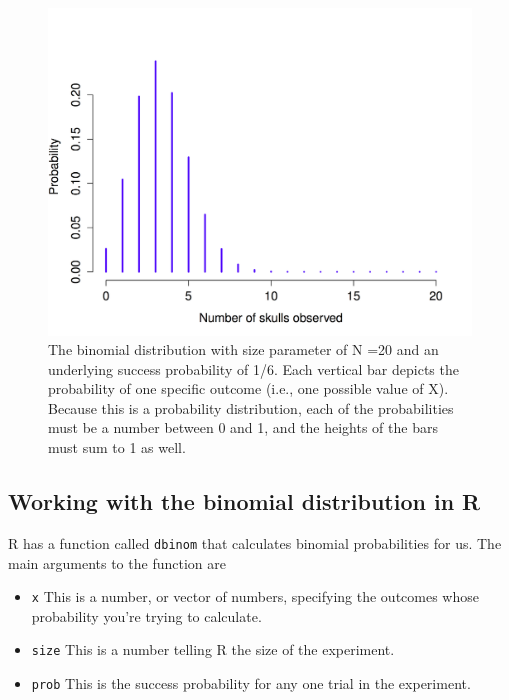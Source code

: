 \documentclass[
]{book}
\begin{document}
\begin{figure}
\centering
\includegraphics{navarro_img/probability/binomSkulls20-eps-converted-to.png}
\caption{\label{fig:4binomial1}The binomial distribution with size parameter of N =20 and an underlying success probability of 1/6. Each vertical bar depicts the probability of one specific outcome (i.e., one possible value of X). Because this is a probability distribution, each of the probabilities must be a number between 0 and 1, and the heights of the bars must sum to 1 as well.}
\end{figure}

\hypertarget{working-with-the-binomial-distribution-in-r}{%
\subsection{Working with the binomial distribution in R}\label{working-with-the-binomial-distribution-in-r}}

R has a function called \texttt{dbinom} that calculates binomial probabilities for us. The main arguments to the function are

\begin{itemize}
\item
  \texttt{x} This is a number, or vector of numbers, specifying the outcomes whose probability you're trying to calculate.
\item
  \texttt{size} This is a number telling R the size of the experiment.
\item
  \texttt{prob} This is the success probability for any one trial in the experiment.
\end{itemize}
\end{document}
